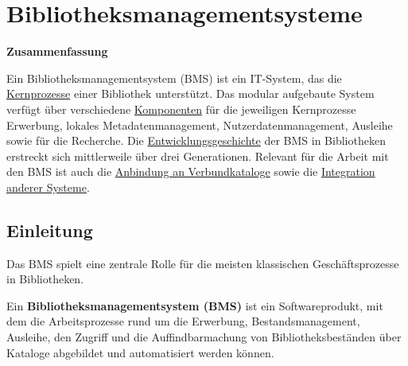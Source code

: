 \documentclass[
  11pt,
  letterpaper,
  DIV=11,
  twoside]{scrreprt}
\begin{document}

\chapter{Bibliotheksmanagementsysteme}\label{sec-bibliotheksmanagementsysteme}

\begin{tcolorbox}[enhanced jigsaw, leftrule=.75mm, toprule=.15mm, left=2mm, opacityback=0, arc=.35mm, colback=white, breakable, colframe=quarto-callout-note-color-frame, rightrule=.15mm, bottomrule=.15mm]
\begin{minipage}[t]{5.5mm}
\textcolor{quarto-callout-note-color}{\faInfo}
\end{minipage}%
\begin{minipage}[t]{\textwidth - 5.5mm}

\vspace{-3mm}\textbf{Zusammenfassung}\vspace{3mm}

Ein Bibliotheksmanagementsystem (BMS) ist ein IT-System, das die
\hyperref[prozessabbildung]{Kernprozesse} einer Bibliothek unterstützt.
Das modular aufgebaute System verfügt über verschiedene
\hyperref[komponenten]{Komponenten} für die jeweiligen Kernprozesse
Erwerbung, lokales Metadatenmanagement, Nutzerdatenmanagement, Ausleihe
sowie für die Recherche. Die
\hyperref[geschichte]{Entwicklungsgeschichte} der BMS in Bibliotheken
erstreckt sich mittlerweile über drei Generationen. Relevant für die
Arbeit mit den BMS ist auch die \hyperref[verbundkataloge]{Anbindung an
Verbundkataloge} sowie die \hyperref[integration]{Integration anderer
Systeme}.

\end{minipage}%
\end{tcolorbox}

\section{Einleitung}\label{einleitung-6}

Das BMS spielt eine zentrale Rolle für die meisten klassischen
Geschäftsprozesse in Bibliotheken.

\begin{tcolorbox}[enhanced jigsaw, leftrule=.75mm, toprule=.15mm, left=2mm, opacityback=0, arc=.35mm, colback=white, breakable, colframe=quarto-callout-important-color-frame, rightrule=.15mm, bottomrule=.15mm]
\begin{minipage}[t]{5.5mm}
\textcolor{quarto-callout-important-color}{\faExclamation}
\end{minipage}%
\begin{minipage}[t]{\textwidth - 5.5mm}

Ein \textbf{Bibliotheksmanagementsystem (BMS)} ist ein Softwareprodukt,
mit dem die Arbeitsprozesse rund um die Erwerbung, Bestandsmanagement,
Ausleihe, den Zugriff und die Auffindbarmachung von Bibliotheksbeständen
über Kataloge abgebildet und automatisiert werden können.

\end{minipage}%
\end{tcolorbox}
\end{document}
